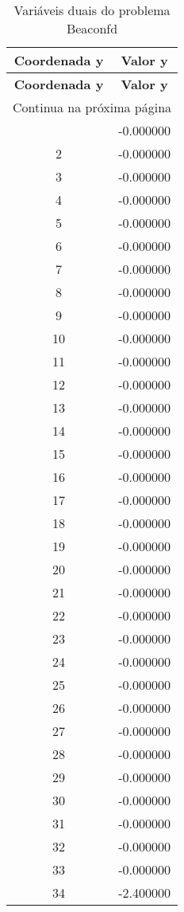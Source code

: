 \documentclass[12pt]{article}
\begin{document}
\begin{longtable}{@{}cc@{}}
\caption{Variáveis duais do problema Beaconfd} \\
\toprule
\textbf{Coordenada y} & \textbf{Valor y} \\
\midrule
\endfirsthead

\toprule
\textbf{Coordenada y} & \textbf{Valor y} \\
\midrule
\endhead

\midrule \multicolumn{2}{r}{{Continua na próxima página}} \\ \midrule
\endfoot

\bottomrule
\endlastfoot
1 & -0.000000 \\
2 & -0.000000 \\
3 & -0.000000 \\
4 & -0.000000 \\
5 & -0.000000 \\
6 & -0.000000 \\
7 & -0.000000 \\
8 & -0.000000 \\
9 & -0.000000 \\
10 & -0.000000 \\
11 & -0.000000 \\
12 & -0.000000 \\
13 & -0.000000 \\
14 & -0.000000 \\
15 & -0.000000 \\
16 & -0.000000 \\
17 & -0.000000 \\
18 & -0.000000 \\
19 & -0.000000 \\
20 & -0.000000 \\
21 & -0.000000 \\
22 & -0.000000 \\
23 & -0.000000 \\
24 & -0.000000 \\
25 & -0.000000 \\
26 & -0.000000 \\
27 & -0.000000 \\
28 & -0.000000 \\
29 & -0.000000 \\
30 & -0.000000 \\
31 & -0.000000 \\
32 & -0.000000 \\
33 & -0.000000 \\
34 & -2.400000 \\

\end{longtable}
\end{document}

